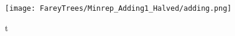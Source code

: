 %
%
%
%
%

\begin{figure}
	\centering
	\texttt{[image: FareyTrees/Minrep\_Adding1\_Halved/adding.png]}
	\caption{t}
	\label{fig:tree.adding1.hor.halved}
\end{figure}

